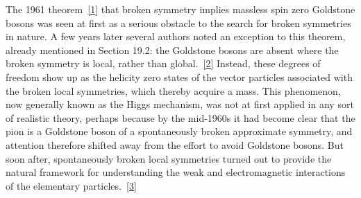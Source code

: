 The 1961 theorem~\hyperref[ch21-ref-1]{[1]} that broken symmetry implies
massless spin zero Goldstone bosons was seen at first as a serious obstacle
to the search for broken symmetries in nature. A few years later several
authors noted an exception to this theorem, already mentioned in Section
19.2: the Goldstone bosons are absent where the broken symmetry is local,
rather than global.~\hyperref[ch21-ref-2]{[2]} Instead, these degrees of
freedom show up as the helicity zero states of the vector particles
associated with the broken local symmetries, which thereby acquire a mass.
This phenomenon, now generally known as the Higgs mechanism, was not at
first applied in any sort of realistic theory, perhaps because by the
mid-1960s it had become clear that the pion is a Goldstone boson of a
spontaneously broken approximate symmetry, and attention therefore shifted
away from the effort to avoid Goldstone bosons. But soon after,
spontaneously broken local symmetries turned out to provide the natural
framework for understanding the weak and electromagnetic interactions of
the elementary particles.~\hyperref[ch21-ref-3]{[3]}
